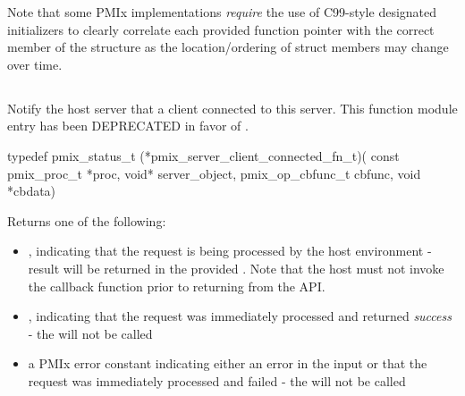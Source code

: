 \advicermstart
Note that some \ac{PMIx} implementations \emph{require} the use of C99-style
designated initializers to clearly correlate each provided function pointer with the correct member of the  structure as the location/ordering of struct members may change over time.
\advicermend

\subsection{}

\summary

Notify the host server that a client connected to this server. This function module entry has been DEPRECATED in favor of .

\format

\cspecificstart
\begin{codepar}
typedef pmix_status_t (*pmix_server_client_connected_fn_t)(
                             const pmix_proc_t *proc,
                             void* server_object,
                             pmix_op_cbfunc_t cbfunc,
                             void *cbdata)
\end{codepar}
\cspecificend

\begin{arglist}
\end{arglist}

Returns one of the following:

\begin{itemize}
    \item {}, indicating that the request is being processed by the host environment - result will be returned in the provided . Note that the host must not invoke the callback function prior to returning from the \ac{API}.
    \item {}, indicating that the request was immediately processed and returned \textit{success} - the  will not be called
    \item a PMIx error constant indicating either an error in the input or that the request was immediately processed and failed - the  will not be called
\end{itemize}

